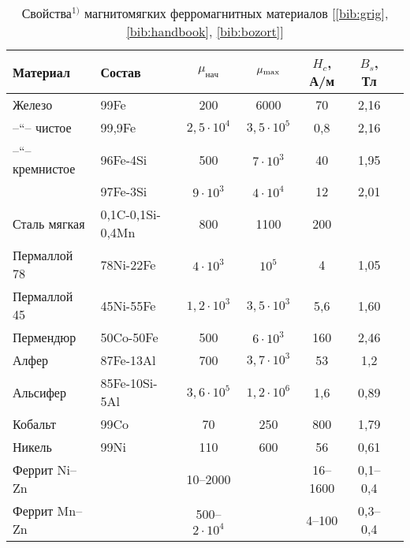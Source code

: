 \begin{labsupplement}
\begin{table}
\caption{Свойства$^{1)}$ магнитомягких ферромагнитных материалов [\ref{bib:grig}, \ref{bib:handbook},
\ref{bib:bozort}]}
\small
 \begin{tabular}{p{2.3cm}p{2cm}ccccc}
 \toprule[1pt]
Материал & Состав & $\mu_{нач}$ & $\mu_{\rm max}$ & $H_c$, А/м & $B_s$, Тл \\
\midrule[1pt]
Железо & 99Fe & 200 & 6000 & 70 & 2,16 \\
--``-- чистое & 99,9Fe & $2,5\cdot 10^4$ & $3,5\cdot 10^5$ & 0,8 & 2,16 \\
--``-- кремнистое & 96Fe-4Si & 500 & $7\cdot 10^3$ & 40 & 1,95 \\
    & 97Fe-3Si & $9\cdot 10^3$ & $4\cdot 10^4$ & 12 & 2,01 \\
Сталь мягкая & 0,1C-0,1Si-0,4Mn & 800 & 1100 & 200 & \\
Пермаллой 78 & 78Ni-22Fe & $4\cdot 10^3$ & $10^5$ & 4 & 1,05 \\
Пермаллой 45 & 45Ni-55Fe & $1,2\cdot 10^3$ & $3,5\cdot 10^3$ & 5,6 & 1,60 \\
Пермендюр & 50Co-50Fe & 500 & $6\cdot 10^3$ & 160 & 2,46 \\
Алфер & 87Fe-13Al & 700 & $3,7\cdot 10^3$ & 53 & 1,2 \\
Альсифер & 85Fe-10Si-5Al & $3,6\cdot 10^5$ & $1,2\cdot 10^6$ & 1,6 & 0,89 \\
Кобальт & 99Co & 70 & 250 & 800 & 1,79 \\
Никель & 99Ni & 110 & 600 & 56 & 0,61 \\
Феррит Ni--Zn & & 10--2000 &  & 16--1600 & 0,1--0,4 \\
Феррит Mn--Zn & & 500--$2\cdot 10^4$ & & 4--100 & 0,3--0,4 \\
\bottomrule
 \end{tabular}\par
\end{table}



\end{labsupplement}
